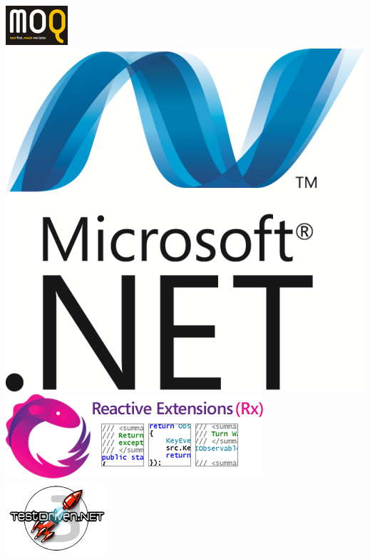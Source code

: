 \documentclass[t]{beamer}
\begin{document}
\begin{frame}
\begin{itemize}
            \includegraphics[scale=0.5]{img/moq}
            \includegraphics[scale=0.15]{img/net}
            \includegraphics[scale=0.4]{img/rx}
            \includegraphics[scale=0.4]{img/td}
	\end{itemize}
\end{frame}
\end{document}
